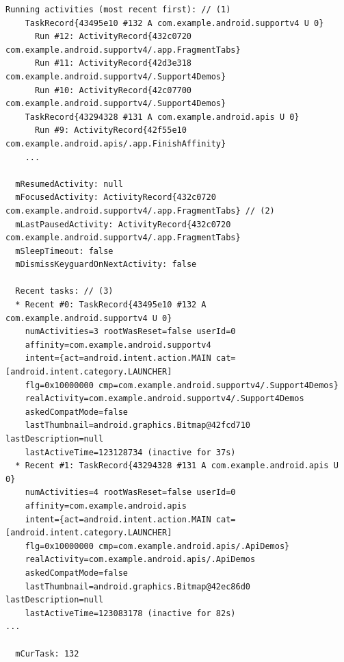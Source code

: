 \begin{lstlisting}[frame=single]
  Running activities (most recent first): // (1)
    TaskRecord{43495e10 #132 A com.example.android.supportv4 U 0}
      Run #12: ActivityRecord{432c0720 com.example.android.supportv4/.app.FragmentTabs}
      Run #11: ActivityRecord{42d3e318 com.example.android.supportv4/.Support4Demos}
      Run #10: ActivityRecord{42c07700 com.example.android.supportv4/.Support4Demos}
    TaskRecord{43294328 #131 A com.example.android.apis U 0}
      Run #9: ActivityRecord{42f55e10 com.example.android.apis/.app.FinishAffinity}
	...
 
  mResumedActivity: null
  mFocusedActivity: ActivityRecord{432c0720 com.example.android.supportv4/.app.FragmentTabs} // (2)
  mLastPausedActivity: ActivityRecord{432c0720 com.example.android.supportv4/.app.FragmentTabs}
  mSleepTimeout: false
  mDismissKeyguardOnNextActivity: false

  Recent tasks: // (3)
  * Recent #0: TaskRecord{43495e10 #132 A com.example.android.supportv4 U 0}
    numActivities=3 rootWasReset=false userId=0
    affinity=com.example.android.supportv4
    intent={act=android.intent.action.MAIN cat=[android.intent.category.LAUNCHER] 
    flg=0x10000000 cmp=com.example.android.supportv4/.Support4Demos}
    realActivity=com.example.android.supportv4/.Support4Demos
    askedCompatMode=false
    lastThumbnail=android.graphics.Bitmap@42fcd710 lastDescription=null
    lastActiveTime=123128734 (inactive for 37s)
  * Recent #1: TaskRecord{43294328 #131 A com.example.android.apis U 0}
    numActivities=4 rootWasReset=false userId=0
    affinity=com.example.android.apis
    intent={act=android.intent.action.MAIN cat=[android.intent.category.LAUNCHER] 
    flg=0x10000000 cmp=com.example.android.apis/.ApiDemos}
    realActivity=com.example.android.apis/.ApiDemos
    askedCompatMode=false
    lastThumbnail=android.graphics.Bitmap@42ec86d0 lastDescription=null
    lastActiveTime=123083178 (inactive for 82s)
...

  mCurTask: 132          
\end{lstlisting}
\lstset{basicstyle=\ttfamily\small}
